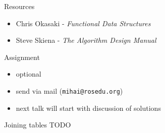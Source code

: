 \documentclass{beamer}
\begin{document}
\begin{frame}{Resources}
  \begin{itemize}
    \item Chris Okasaki - \textit{Functional Data Structures}
    \item Steve Skiena - \textit{The Algorithm Design Manual}
  \end{itemize}
\end{frame}

\begin{frame}[fragile]{Assignment}
  \begin{itemize}
    \item optional
    \item send via mail (\texttt{mihai@rosedu.org})
    \item next talk will start with discussion of solutions
  \end{itemize}
  \pause
  \begin{block}{Joining tables}
  TODO
  \end{block}
\end{frame}
\end{document}
